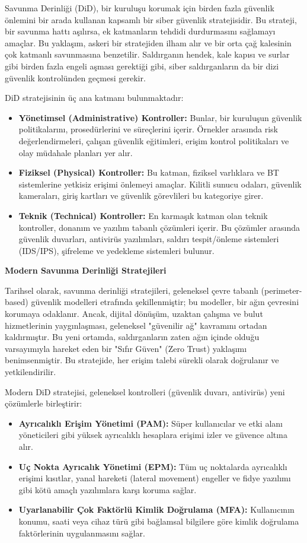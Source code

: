 Savunma Derinliği (DiD), bir kuruluşu korumak için birden fazla güvenlik önlemini bir arada kullanan kapsamlı bir siber güvenlik stratejisidir. Bu strateji, bir savunma hattı aşılırsa, ek katmanların tehdidi durdurmasını sağlamayı amaçlar. Bu yaklaşım, askeri bir stratejiden ilham alır ve bir orta çağ kalesinin çok katmanlı savunmasına benzetilir. Saldırganın hendek, kale kapısı ve surlar gibi birden fazla engeli aşması gerektiği gibi, siber saldırganların da bir dizi güvenlik kontrolünden geçmesi gerekir.

DiD stratejisinin üç ana katmanı bulunmaktadır:

\begin{itemize}
    \item \textbf{Yönetimsel (Administrative) Kontroller:} Bunlar, bir kuruluşun güvenlik politikalarını, prosedürlerini ve süreçlerini içerir. Örnekler arasında risk değerlendirmeleri, çalışan güvenlik eğitimleri, erişim kontrol politikaları ve olay müdahale planları yer alır.
    \item \textbf{Fiziksel (Physical) Kontroller:} Bu katman, fiziksel varlıklara ve BT sistemlerine yetkisiz erişimi önlemeyi amaçlar. Kilitli sunucu odaları, güvenlik kameraları, giriş kartları ve güvenlik görevlileri bu kategoriye girer.
    \item \textbf{Teknik (Technical) Kontroller:} En karmaşık katman olan teknik kontroller, donanım ve yazılım tabanlı çözümleri içerir. Bu çözümler arasında güvenlik duvarları, antivirüs yazılımları, saldırı tespit/önleme sistemleri (IDS/IPS), şifreleme ve yedekleme sistemleri bulunur.
\end{itemize}

\textbf{Modern Savunma Derinliği Stratejileri}

Tarihsel olarak, savunma derinliği stratejileri, geleneksel çevre tabanlı (perimeter-based) güvenlik modelleri etrafında şekillenmiştir; bu modeller, bir ağın çevresini korumaya odaklanır. Ancak, dijital dönüşüm, uzaktan çalışma ve bulut hizmetlerinin yaygınlaşması, geleneksel "güvenilir ağ" kavramını ortadan kaldırmıştır. Bu yeni ortamda, saldırganların zaten ağın içinde olduğu varsayımıyla hareket eden bir "Sıfır Güven" (Zero Trust) yaklaşımı benimsenmiştir. Bu stratejide, her erişim talebi sürekli olarak doğrulanır ve yetkilendirilir.

Modern DiD stratejisi, geleneksel kontrolleri (güvenlik duvarı, antivirüs) yeni çözümlerle birleştirir:

\begin{itemize}
    \item \textbf{Ayrıcalıklı Erişim Yönetimi (PAM):} Süper kullanıcılar ve etki alanı yöneticileri gibi yüksek ayrıcalıklı hesaplara erişimi izler ve güvence altına alır.
    \item \textbf{Uç Nokta Ayrıcalık Yönetimi (EPM):} Tüm uç noktalarda ayrıcalıklı erişimi kısıtlar, yanal hareketi (lateral movement) engeller ve fidye yazılımı gibi kötü amaçlı yazılımlara karşı koruma sağlar.
    \item \textbf{Uyarlanabilir Çok Faktörlü Kimlik Doğrulama (MFA):} Kullanıcının konumu, saati veya cihaz türü gibi bağlamsal bilgilere göre kimlik doğrulama faktörlerinin uygulanmasını sağlar.
\end{itemize}

